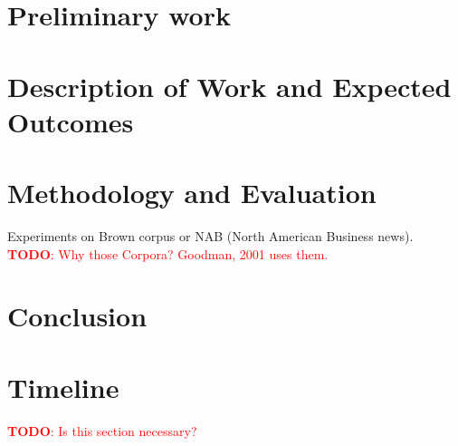 \documentclass[11pt,a4paper]{article}
\newcommand{\todo}[1]{\textcolor{red}{\textbf{TODO}: #1}}
\begin{document}
\section{Preliminary work}

\section{Description of Work and Expected Outcomes}

\section{Methodology and Evaluation}

Experiments on Brown corpus or NAB (North American Business news).
\todo{Why those Corpora? Goodman, 2001 uses them.}

\section{Conclusion}

\section{Timeline}

\todo{Is this section necessary?}

\printbibliography
\end{document}
